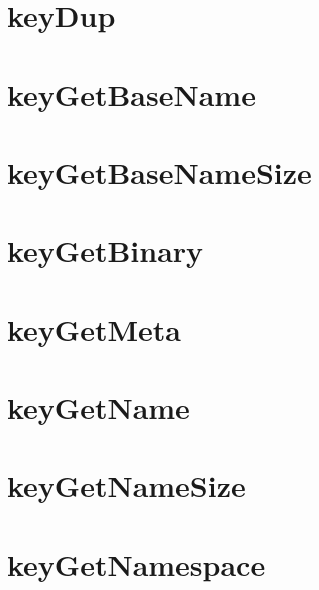 \let\mypdfximage\pdfximage\def\pdfximage{\immediate\mypdfximage}\documentclass[twoside]{book}
\newcommand{\+}{\discretionary{\mbox{\scriptsize$\hookleftarrow$}}{}{}}
\begin{document}
\chapter{key\+Dup}
\label{doc_contrib_api_reviews_core_keyDup_md}

\chapter{key\+Get\+Base\+Name}
\label{doc_contrib_api_reviews_core_keyGetBaseName_md}

\chapter{key\+Get\+Base\+Name\+Size}
\label{doc_contrib_api_reviews_core_keyGetBaseNameSize_md}

\chapter{key\+Get\+Binary}
\label{doc_contrib_api_reviews_core_keyGetBinary_md}

\chapter{key\+Get\+Meta}
\label{doc_contrib_api_reviews_core_keyGetMeta_md}

\chapter{key\+Get\+Name}
\label{doc_contrib_api_reviews_core_keyGetName_md}

\chapter{key\+Get\+Name\+Size}
\label{doc_contrib_api_reviews_core_keyGetNameSize_md}

\chapter{key\+Get\+Namespace}
\label{doc_contrib_api_reviews_core_keyGetNamespace_md}

\end{document}
